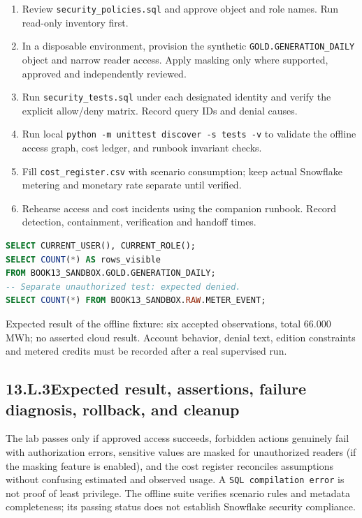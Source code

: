 \documentclass[11pt,twoside]{article}
\newcommand{\topic}[2]{\subsection*{#1\quad #2}}
\begin{document}
\begin{enumerate}
\item Review \texttt{security\_policies.sql} and approve object and role names. Run read-only inventory first.
\item In a disposable environment, provision the synthetic \texttt{GOLD.GENERATION\_DAILY} object and narrow reader access. Apply masking only where supported, approved and independently reviewed.
\item Run \texttt{security\_tests.sql} under each designated identity and verify the explicit allow/deny matrix. Record query IDs and denial causes.
\item Run local \texttt{python -m unittest discover -s tests -v} to validate the offline access graph, cost ledger, and runbook invariant checks.
\item Fill \texttt{cost\_register.csv} with scenario consumption; keep actual Snowflake metering and monetary rate separate until verified.
\item Rehearse access and cost incidents using the companion runbook. Record detection, containment, verification and handoff times.
\end{enumerate}
\begin{lstlisting}[language=SQL,caption={Illustrative approved-reader test in an isolated account.}]
SELECT CURRENT_USER(), CURRENT_ROLE();
SELECT COUNT(*) AS rows_visible
FROM BOOK13_SANDBOX.GOLD.GENERATION_DAILY;
-- Separate unauthorized test: expected denied.
SELECT COUNT(*) FROM BOOK13_SANDBOX.RAW.METER_EVENT;
\end{lstlisting}
Expected result of the offline fixture: six accepted observations, total 66.000 MWh; no asserted cloud result. Account behavior, denial text, edition constraints and metered credits must be recorded after a real supervised run.
\newpage
\topic{13.L.3}{Expected result, assertions, failure diagnosis, rollback, and cleanup}
The lab passes only if approved access succeeds, forbidden actions genuinely fail with authorization errors, sensitive values are masked for unauthorized readers (if the masking feature is enabled), and the cost register reconciles assumptions without confusing estimated and observed usage. A \texttt{SQL compilation error} is not proof of least privilege. The offline suite verifies scenario rules and metadata completeness; its passing status does not establish Snowflake security compliance.
\end{document}
